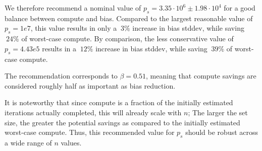 We therefore recommend a nominal value of $p_s = 3.35 \cdot 10^{6} \pm 1.98 \cdot 10^{4}$ for a good balance between compute and bias. Compared to the largest reasonable value of $p_s = 1e7$, this value results in only a $~3\%$ increase in bias stddev, while saving $~24\%$ of worst-case compute. By comparison, the less conservative value of $p_s = 4.43e5$ results in a $~12\%$ increase in bias stddev, while saving $~39\%$ of worst-case compute.

The recommendation corresponds to $\beta = 0.51$, meaning that compute savings are considered roughly half as important as bias reduction.

It is noteworthy that since compute is a fraction of the initially estimated iterations actually completed, this will already scale with $n$; The larger the set size, the greater the potential savings as compared to the initially estimated worst-case compute. Thus, this recommended value for $p_s$ should be robust across a wide range of $n$ values.